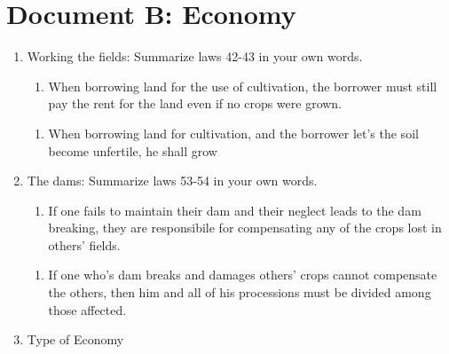 \documentclass[12pt]{article}
\begin{document}
\section*{Document B: Economy}
\begin{enumerate}
\item{Working the fields: Summarize laws 42-43 in your own words.}
\begin{enumerate}[42.]
    \item{When borrowing land for the use of cultivation, the borrower must
    still pay the rent for the land even if no crops were grown.}
\end{enumerate}
\begin{enumerate}[43.]
    \item{When borrowing land for cultivation, and the borrower let's the soil
    become unfertile, he shall grow}
\end{enumerate}

\item{The dams: Summarize laws 53-54 in your own words.}
\begin{enumerate}[53.]
    \item{If one fails to maintain their dam and their neglect leads to the dam
    breaking, they are responsibile for compensating any of the crops lost in
    others' fields.}
\end{enumerate}
\begin{enumerate}[54.]
    \item{If one who's dam breaks and damages others' crops cannot compensate
    the others, then him and all of his processions must be divided among those
    affected.}
\end{enumerate}

    \item{Type of Economy}
\end{enumerate}
\end{document}
